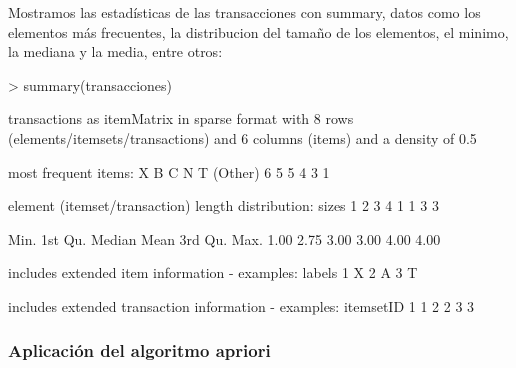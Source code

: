 \documentclass [a4paper] {article}
\begin{document}
Mostramos las estadísticas de las transacciones con summary, datos como los elementos más frecuentes, la distribucion
del tamaño de los elementos, el minimo, la mediana y la media, entre otros:
\begin{Schunk}
\begin{Sinput}
> summary(transacciones)
\end{Sinput}
\begin{Soutput}
transactions as itemMatrix in sparse format with
 8 rows (elements/itemsets/transactions) and
 6 columns (items) and a density of 0.5 

most frequent items:
      X       B       C       N       T (Other) 
      6       5       5       4       3       1 

element (itemset/transaction) length distribution:
sizes
1 2 3 4 
1 1 3 3 

   Min. 1st Qu.  Median    Mean 3rd Qu.    Max. 
   1.00    2.75    3.00    3.00    4.00    4.00 

includes extended item information - examples:
  labels
1      X
2      A
3      T

includes extended transaction information - examples:
  itemsetID
1         1
2         2
3         3
\end{Soutput}
\end{Schunk}

\subsubsection{Aplicación del algoritmo apriori}
\end{document}
